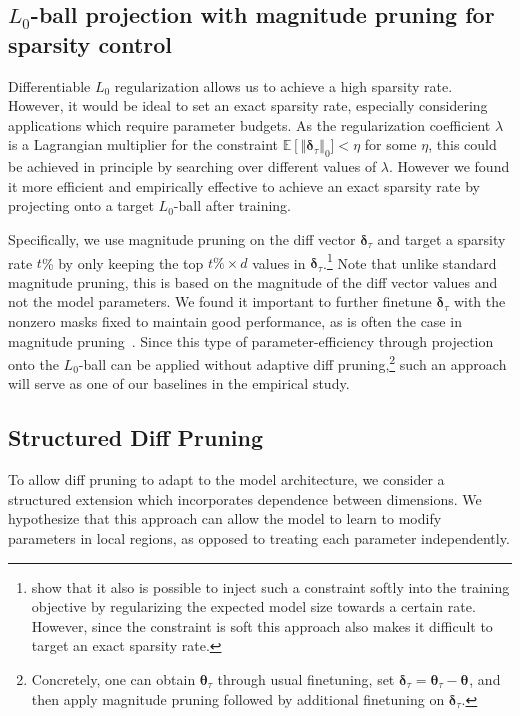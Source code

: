 \subsection{$L_0$-ball projection with magnitude pruning for sparsity control}

Differentiable $L_0$ regularization allows us to achieve a high sparsity rate.  However, it would be ideal to set an exact sparsity rate, especially considering applications which require parameter budgets. As  the regularization coefficient $\lambda$ is a Lagrangian multiplier for the constraint $\mathbb{E}\left[\Vert \boldsymbol{\delta}_\tau \right \Vert_0] < \eta $ for some $\eta$, this could be achieved in principle by searching over different values of $\lambda$. However we found it more efficient and empirically effective to achieve an exact sparsity rate by projecting onto a target $L_0$-ball after training. 

Specifically, we use magnitude pruning on the diff vector $\boldsymbol{\delta}_\tau$ and target a sparsity rate $t$\% by only keeping the top $t\% \times d$ values in $\boldsymbol{\delta}_\tau$.\footnote{
\citet{wang2019structuredpruning} show that it also is possible to inject such a constraint softly into the training objective by regularizing the expected model size towards a certain rate. However, since the constraint is soft this approach also makes it difficult to target an exact sparsity rate.} Note that unlike standard magnitude pruning, this is based on the magnitude of the diff vector values and not the model parameters. We found it important to further finetune $\boldsymbol{\delta}_\tau$ with the nonzero masks fixed to maintain good performance, as is often the case in magnitude pruning~\citep{han2016comp}. Since this type of parameter-efficiency through projection onto the $L_0$-ball can be applied without adaptive diff pruning,\footnote{Concretely, one can obtain $\boldsymbol{\theta}_\tau$ through usual finetuning, set $\boldsymbol{\delta}_\tau = \boldsymbol{\theta}_\tau - \boldsymbol{\theta}_\text{}$, and then apply magnitude pruning followed by additional finetuning on $\boldsymbol{\delta}_\tau$.} such an approach will serve as one of our baselines in the empirical study.

\subsection{Structured Diff Pruning}

To allow diff pruning to adapt to the model architecture, we consider a structured extension which incorporates dependence between dimensions. We hypothesize that this approach can allow the model to learn to modify parameters in local regions, as opposed to treating each parameter independently.

